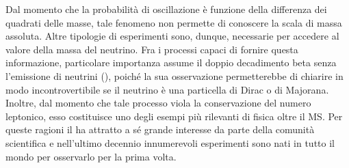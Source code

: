 

Dal momento che la probabilità di oscillazione è funzione della differenza dei quadrati delle masse, tale fenomeno non permette di conoscere la scala di massa assoluta. 
Altre tipologie di esperimenti sono, dunque, necessarie per accedere al valore della massa del neutrino.
Fra i processi capaci di fornire questa informazione, particolare importanza assume il doppio decadimento beta senza l'emissione di neutrini (\doppiobeta), poiché la sua osservazione permetterebbe di chiarire in modo incontrovertibile se il neutrino è una particella di Dirac o di Majorana.
Inoltre, dal momento che tale processo viola la conservazione del numero leptonico, esso costituisce uno degli esempi più rilevanti di fisica oltre il MS.
Per queste ragioni il \doppiobeta{} ha attratto a sé grande interesse da parte della comunità scientifica e nell'ultimo decennio innumerevoli esperimenti sono nati in tutto il mondo per osservarlo per la prima volta.
%
%
%
%
%
%
%
